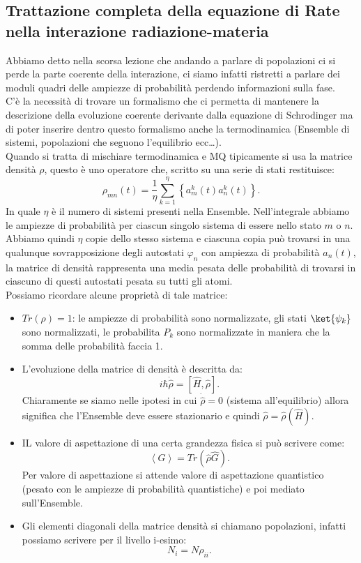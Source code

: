 \subsection{Trattazione completa della equazione di Rate nella interazione radiazione-materia}%
\label{sub:Trattazione completa della equazione di Rate nella interazione radiazione-materia}
Abbiamo detto nella scorsa lezione che andando a parlare di popolazioni ci si perde la parte coerente della interazione, ci siamo infatti ristretti a parlare dei moduli quadri delle ampiezze di probabilità perdendo informazioni sulla fase.\\
C'è la necessità di trovare un formalismo che ci permetta di mantenere la descrizione della evoluzione coerente derivante dalla equazione di Schrodinger ma di poter inserire dentro questo formalismo anche la termodinamica (Ensemble di sistemi, popolazioni che seguono l'equilibrio ecc\ldots). \\
Quando si tratta di mischiare termodinamica e MQ tipicamente si usa la matrice densità $\rho$, questo è uno operatore che, scritto su una serie di stati restituisce:
\[
    \rho_{mn}(t) = \frac{1}{\eta}\sum_{k=1}^{\eta} \left\{a^k_m(t) a^k_n(t) \right\}
.\] 
In quale $\eta$ è il numero di sistemi presenti nella Ensemble. Nell'integrale abbiamo le ampiezze di probabilità per ciascun singolo sistema di essere nello stato $m$ o $n$. \\
Abbiamo quindi $\eta$ copie dello stesso sistema e ciascuna copia può trovarsi in una qualunque sovrapposizione degli autostati $\varphi_n$ con ampiezza di probabilità $a_n(t)$, la matrice di densità rappresenta una media pesata delle probabilità di trovarsi in ciascuno di questi autostati pesata su tutti gli atomi. \\
Possiamo ricordare alcune proprietà di tale matrice:
\begin{itemize}
    \item $Tr(\rho) = 1$: le ampiezze di probabilità sono normalizzate, gli stati $\ket{\psi_k}$  sono normalizzati, le probabilita $P_k$ sono normalizzate in maniera che la somma delle probabilità faccia 1. 
    \item L'evoluzione della matrice di densità è descritta da:
	\[
	    i\hbar \dot{\hat{\rho}} = \left[\hat{H},\hat{\rho}\right]
	.\] 
	Chiaramente se siamo nelle ipotesi in cui $\dot{\hat{\rho}}=0$ (sistema all'equilibrio) allora significa che l'Ensemble deve essere stazionario e quindi $\hat{\rho}= \hat{\rho}(\hat{H})$.
    \item IL valore di aspettazione di una certa grandezza fisica si può scrivere come:
	\[
	    \left<G\right>= Tr(\hat{\rho}\hat{G}) 
	.\] 
	Per valore di aspettazione si attende valore di aspettazione quantistico (pesato con le ampiezze di probabilità quantistiche) e poi mediato sull'Ensemble.
    \item Gli elementi diagonali della matrice densità si chiamano popolazioni, infatti possiamo scrivere per il livello i-esimo:
	\[
		N_i = N\rho_{ii}
	.\] 
\end{itemize}
